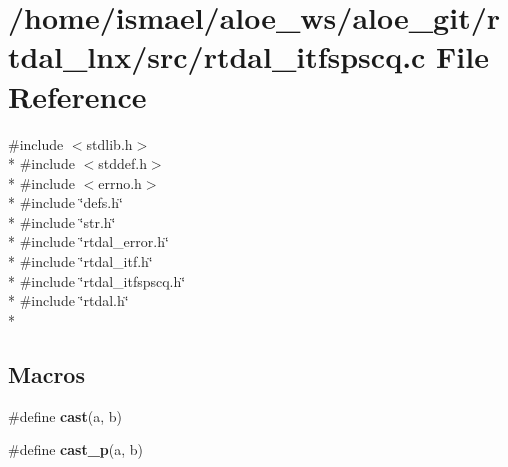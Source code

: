 \section{/home/ismael/aloe\-\_\-ws/aloe\-\_\-git/rtdal\-\_\-lnx/src/rtdal\-\_\-itfspscq.c File Reference}
\label{rtdal__itfspscq_8c}
{\ttfamily \#include $<$stdlib.\-h$>$}\\*
{\ttfamily \#include $<$stddef.\-h$>$}\\*
{\ttfamily \#include $<$errno.\-h$>$}\\*
{\ttfamily \#include \char`\"{}defs.\-h\char`\"{}}\\*
{\ttfamily \#include \char`\"{}str.\-h\char`\"{}}\\*
{\ttfamily \#include \char`\"{}rtdal\-\_\-error.\-h\char`\"{}}\\*
{\ttfamily \#include \char`\"{}rtdal\-\_\-itf.\-h\char`\"{}}\\*
{\ttfamily \#include \char`\"{}rtdal\-\_\-itfspscq.\-h\char`\"{}}\\*
{\ttfamily \#include \char`\"{}rtdal.\-h\char`\"{}}\\*
\subsection*{Macros}
\begin{DoxyCompactItemize}
\item 
\#define {\bf cast}(a, b)
\item 
\#define {\bf cast\-\_\-p}(a, b)
\end{DoxyCompactItemize}
